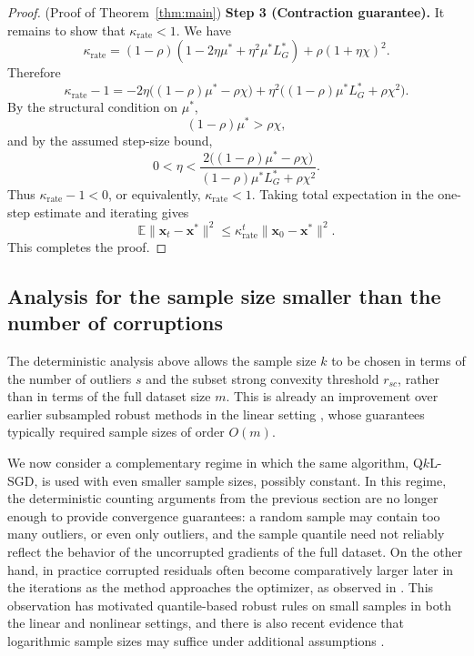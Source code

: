 \documentclass[11pt]{article}
\newcommand{\ve}[1]{\mathbf{#1}}
\begin{document}
\begin{proof}{(Proof of Theorem~\ref{thm:main})}
\textbf{Step 3 {(Contraction guarantee)}.} It remains to show that $\kappa_{\mathrm{rate}}<1$.
We have
\[
\kappa_{\mathrm{rate}}
=
(1-\rho)(1-2\eta\mu^*+\eta^2\mu^* L_{G}^*)
+
\rho(1+\eta \chi)^2.
\]
Therefore
\[
\kappa_{\mathrm{rate}}-1
=
-2\eta\bigl((1-\rho)\mu^*-\rho \chi\bigr)
+
\eta^2\bigl((1-\rho)\mu^* L_{G}^*+\rho \chi^2\bigr).
\]
By the structural condition on $\mu^*$,
\[
(1-\rho)\mu^*>\rho \chi,
\]
and by the assumed step-size bound,
\[
0<\eta<
\frac{
2\bigl((1-\rho)\mu^*-\rho \chi\bigr)
}{
(1-\rho)\mu^* L_{G}^*+\rho \chi^2
}.
\]
Thus $\kappa_{\mathrm{rate}}-1<0$,
or equivalently,
$
\kappa_{\mathrm{rate}}<1.
$
Taking total expectation in the one-step estimate and iterating gives
\[
\mathbb{E}\|\ve{x}_t-\ve{x}^*\|^2
\le
\kappa_{\mathrm{rate}}^t
\|\ve{x}_0-\ve{x}^*\|^2.
\]
This completes the proof.
\end{proof}


\subsection{Analysis for the sample size smaller than the number of corruptions}\label{sec:small-sample}

The deterministic analysis above allows the sample size \(k\) to be chosen in
terms of the number of outliers {$s$} and the subset strong convexity threshold {$r_{sc}$},
rather than in terms of the full dataset size \(m\). This is already an improvement over earlier subsampled robust methods in the linear
setting \citep{haddock2023subsampled, HNRS20}, whose guarantees typically
required sample sizes of order \(O(m)\).

We now consider a complementary regime in which the same algorithm,
Q\(k\)L-SGD, is used with even smaller sample sizes, possibly constant. In this
regime, the deterministic counting arguments from the previous section are no
longer {enough to provide convergence guarantees}: a random sample may contain too many outliers, or even only
outliers, and the sample quantile need not reliably reflect the behavior of the
uncorrupted gradients of the full dataset. On the other hand, in practice
corrupted residuals often become comparatively larger later in the iterations
as the method approaches the optimizer, as observed in
\citep{haddock2019randomized,shvaiko2026quantile}. This observation has
motivated quantile-based robust rules on small samples in both the linear
\citep{haddock2023subsampled} and nonlinear \citep{shah2020choosing} settings, and there is also recent evidence
that logarithmic sample sizes may suffice under additional assumptions
\citep{cai2025subsample}.
\end{document}
